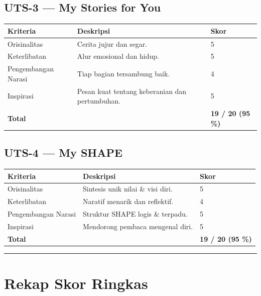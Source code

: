 \documentclass[
  letterpaper,
  DIV=11,
  numbers=noendperiod]{scrreprt}
\begin{document}
\subsection{\texorpdfstring{\textbf{UTS-3 --- My Stories for
You}}{UTS-3 --- My Stories for You}}\label{uts-3-my-stories-for-you}

\begin{longtable}[]{@{}lll@{}}
\toprule\noalign{}
Kriteria & Deskripsi & Skor \\
\midrule\noalign{}
\endhead
\bottomrule\noalign{}
\endlastfoot
Orisinalitas & Cerita jujur dan segar. & 5 \\
Keterlibatan & Alur emosional dan hidup. & 5 \\
Pengembangan Narasi & Tiap bagian tersambung baik. & 4 \\
Inspirasi & Pesan kuat tentang keberanian dan pertumbuhan. & 5 \\
\textbf{Total} & & \textbf{19 / 20 (95 \%)} \\
\end{longtable}

\subsection{\texorpdfstring{\textbf{UTS-4 --- My
SHAPE}}{UTS-4 --- My SHAPE}}\label{uts-4-my-shape-1}

\begin{longtable}[]{@{}lll@{}}
\toprule\noalign{}
Kriteria & Deskripsi & Skor \\
\midrule\noalign{}
\endhead
\bottomrule\noalign{}
\endlastfoot
Orisinalitas & Sintesis unik nilai \& visi diri. & 5 \\
Keterlibatan & Naratif menarik dan reflektif. & 4 \\
Pengembangan Narasi & Struktur SHAPE logis \& terpadu. & 5 \\
Inspirasi & Mendorong pembaca mengenal diri. & 5 \\
\textbf{Total} & & \textbf{19 / 20 (95 \%)} \\
\end{longtable}

\begin{center}\rule{0.5\linewidth}{0.5pt}\end{center}

\section{\texorpdfstring{\textbf{Rekap Skor
Ringkas}}{Rekap Skor Ringkas}}\label{rekap-skor-ringkas}
\end{document}
